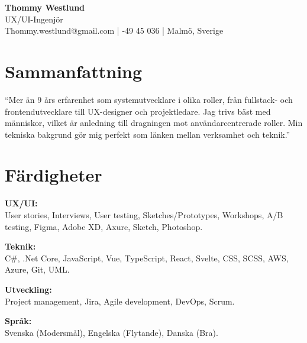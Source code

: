 \documentclass[a4paper,10pt]{article}
\begin{document}
\begin{center}
    \huge \textbf{Thommy Westlund}\\
    \vspace{0.2cm}
    \Large UX/UI-Ingenjör\\
    \vspace{0.3cm}
    \normalsize Thommy.westlund@gmail.com \quad | -49 45 036 \quad | \quad Malmö, Sverige
\end{center}

\vspace{0.5cm}

\section*{Sammanfattning}
\vspace{0.2cm}

\noindent
“Mer än 9 års erfarenhet som systemutvecklare i olika roller, från fullstack- och frontendutvecklare till UX-designer och projektledare. Jag trivs bäst med människor, vilket är anledning till dragningen mot användarcentrerade roller. Min tekniska bakgrund gör mig perfekt som länken mellan verksamhet och teknik.”
\vspace{0.3cm}

\section*{Färdigheter}

\textbf{UX/UI:}\\
User stories, Interviews, User testing, Sketches/Prototypes, Workshops, A/B testing, Figma, Adobe XD, Axure, Sketch, Photoshop.

\vspace{0.3cm}

\textbf{Teknik:}\\
C\#, .Net Core, JavaScript, Vue, TypeScript, React, Svelte, CSS, SCSS, AWS, Azure, Git, UML.

\vspace{0.3cm}

\textbf{Utveckling:}\\
Project management, Jira, Agile development, DevOps, Scrum.

\vspace{0.3cm}

\textbf{Språk:}\\
Svenska (Modersmål), Engelska (Flytande), Danska (Bra).
\end{document}
